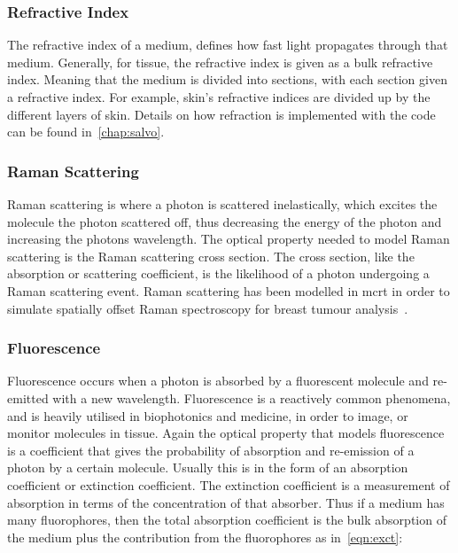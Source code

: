\medskip

\subsubsection*{Refractive Index}
The refractive index of a medium, defines how fast light propagates through that medium. Generally, for tissue, the refractive index is given as a bulk refractive index. Meaning that the medium is divided into sections, with each section given a refractive index. For example, skin's refractive indices are divided up by the different layers of skin. Details on how refraction is implemented with the code can  be found in~\cref{chap:salvo}.

\medskip

\subsubsection*{Raman Scattering}
Raman scattering is where a photon is scattered inelastically, which excites the molecule the photon scattered off, thus decreasing the energy of the photon and increasing the photons wavelength. 
The optical property needed to model Raman scattering is the Raman scattering cross section. The cross section, like the absorption or scattering coefficient, is the likelihood of a photon undergoing a Raman scattering event. Raman scattering has been modelled in \gls*{mcrt} in order to simulate spatially offset Raman spectroscopy for breast tumour analysis~\cite{keller2010monte}.

\medskip

\subsubsection*{Fluorescence}



Fluorescence occurs when a photon is absorbed by a fluorescent molecule and re-emitted with a new wavelength. Fluorescence	is a reactively common phenomena, and is heavily utilised in biophotonics and medicine, in order to image, or monitor molecules in tissue. Again the optical property that models fluorescence is a coefficient that gives the probability of absorption and re-emission of a photon by a certain molecule. Usually this is in the form of an absorption coefficient or extinction coefficient. The extinction coefficient is a measurement of absorption in terms of the concentration of that absorber. Thus if a medium has many fluorophores, then the total absorption coefficient is the bulk absorption of the medium plus the contribution from the fluorophores as in~\cref{eqn:exct}:

